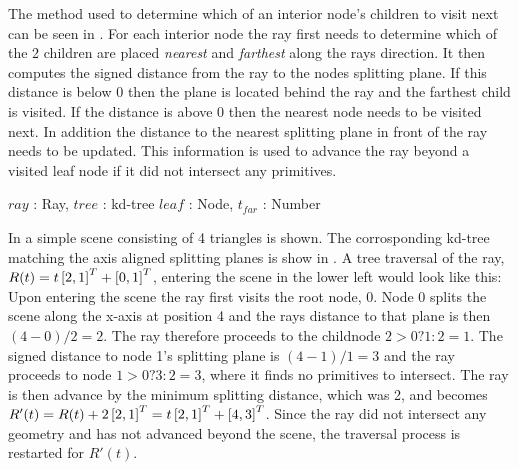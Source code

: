
The method used to determine which of an interior node's children to
visit next can be seen in . For each
interior node the ray first needs to determine which of the 2 children
are placed \textit{nearest} and \textit{farthest} along the rays
direction. It then computes the signed distance from the ray to the
nodes splitting plane. If this distance is below 0 then the plane is
located behind the ray and the farthest child is visited. If the
distance is above 0 then the nearest node needs to be visited next. In
addition the distance to the nearest splitting plane in front of the
ray needs to be updated. This information is used to advance the ray
beyond a visited leaf node if it did not intersect any primitives.

\begin{algorithm}
  \caption{A basic kd-tree traversal algorithm}
  \label{alg:generelTraversal}
  \begin{algorithmic}
              {$ray$ : Ray, $tree$ : kd-tree}
              {$leaf$ : Node, $t_{far}$ : Number}{
                  \ELSE
                  \ENDIF
                \ENDWHILE
              }
  \end{algorithmic}
\end{algorithm}

In  a simple scene consisting of 4 triangles
is shown. The corrosponding kd-tree matching the axis aligned
splitting planes is show in . A tree traversal
of the ray, $R(t) = t \left[2, 1 \right]^T + \left[0, 1 \right]^T$, entering the
scene in the lower left would look like this: Upon entering the scene
the ray first visits the root node, 0. Node 0 splits the scene along
the x-axis at position 4 and the rays distance to that plane is then
$(4 - 0) / 2 = 2$. The ray therefore proceeds to the childnode $2 > 0
? 1 : 2 = 1$. The signed distance to node 1's splitting plane is $(4 -
1) / 1 = 3$ and the ray proceeds to node $1 > 0 ? 3 : 2 = 3$, where it
finds no primitives to intersect. The ray is then advance by the
minimum splitting distance, which was 2, and becomes $R'(t) = R(t) + 2
\left[2, 1 \right]^T = t \left[2, 1 \right]^T + \left[4, 3 \right]^T$. Since the ray did
not intersect any geometry and has not advanced beyond the scene, the
traversal process is restarted for $R'(t)$.



